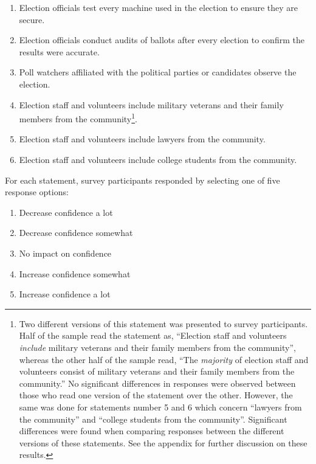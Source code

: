 \documentclass[
  11pt,
  a4paper,
]{article}
\providecommand{\tightlist}{%
  \setlength{\itemsep}{0pt}\setlength{\parskip}{0pt}}\usepackage{longtable,booktabs,array}
\begin{document}
\begin{enumerate}
\def\labelenumi{\arabic{enumi}.}
\tightlist
\item
  Election officials test every machine used in the election to ensure
  they are secure.
\item
  Election officials conduct audits of ballots after every election to
  confirm the results were accurate.
\item
  Poll watchers affiliated with the political parties or candidates
  observe the election.
\item
  Election staff and volunteers include military veterans and their
  family members from the community\footnote{Two different versions of
    this statement was presented to survey participants. Half of the
    sample read the statement as, ``Election staff and volunteers
    \emph{include} military veterans and their family members from the
    community'', whereas the other half of the sample read, ``The
    \emph{majority} of election staff and volunteers consist of military
    veterans and their family members from the community.'' No
    significant differences in responses were observed between those who
    read one version of the statement over the other. However, the same
    was done for statements number 5 and 6 which concern ``lawyers from
    the community'' and ``college students from the community''.
    Significant differences were found when comparing responses between
    the different versions of these statements. See the appendix for
    further discussion on these results.}.
\item
  Election staff and volunteers include lawyers from the community.
\item
  Election staff and volunteers include college students from the
  community.
\end{enumerate}

For each statement, survey participants responded by selecting one of
five response options:

\begin{enumerate}
\def\labelenumi{\arabic{enumi}.}
\tightlist
\item
  Decrease confidence a lot
\item
  Decrease confidence somewhat
\item
  No impact on confidence
\item
  Increase confidence somewhat
\item
  Increase confidence a lot
\end{enumerate}
\end{document}
